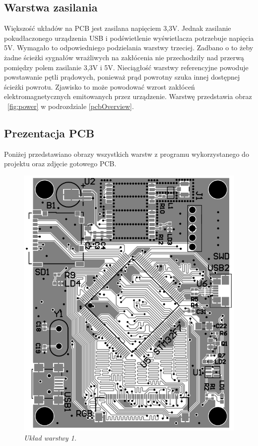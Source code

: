 \documentclass[eng,printmode]{mgr}
\begin{document}
\subsection*{Warstwa zasilania}
Większość układów na PCB jest zasilana napięciem 3,3V. Jednak zasilanie pokudłaczonego urządzenia USB i podświetlenie wyświetlacza potrzebuje napięcia 5V. Wymagało to odpowiedniego podzielania warstwy trzeciej. Zadbano o to żeby żadne ścieżki sygnałów wrażliwych na zakłócenia nie przechodziły nad przerwą pomiędzy polem zasilanie 3,3V i 5V. Nieciągłość warstwy referencyjne powoduje powstawanie pętli prądowych, ponieważ prąd powrotny szuka innej dostępnej ścieżki powrotu. Zjawisko to może powodować wzrost zakłóceń elektromagnetycznych emitowanych przez urządzenie. Warstwę przedstawia obraz ~\ref{fig:power} w podrozdziale \ref{pcbOverview}.

\subsection*{Prezentacja PCB} \label{pcbOverview}
Poniżej przedstawiano obrazy wszystkich warstw z programu wykorzystanego do projektu oraz zdjęcie gotowego PCB.
\begin{center}\centering
\begin{figure}[!h]
    \centering
    \includegraphics[width=\textwidth]{pcb/top.png}
    \caption{\textit{Układ warstwy 1.}}
\end{figure}
\end{center}
\end{document}
